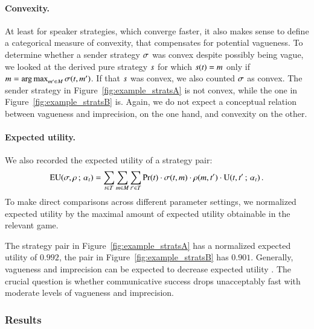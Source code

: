 \paragraph{Convexity.} At least for speaker strategies, which converge
faster, it also makes sense to define a categorical measure of
convexity, that compensates for potential vagueness. To determine
whether a sender strategy $\sigma$ was convex despite possibly being
vague, we looked at the derived pure strategy $s$ for which
$s(t) = m$ only if $m =
\operatorname*{arg\,max}_{m' \in M} \sigma(t,m')$. If that $s$
was convex, we also counted $\sigma$ as convex. The sender strategy
in Figure~\ref{fig:example_stratsA} is not convex, while the one in
Figure~\ref{fig:example_stratsB} is. Again, we do not expect a
conceptual relation between vagueness and imprecision, on the one
hand, and convexity on the other.

\paragraph{Expected utility.} We also recorded the expected utility of
a strategy pair:
\begin{align*}
  \mathrm{EU}(\sigma,\rho \thinspace ; \thinspace \alpha_t) = \sum_{t \in
    T} \sum_{m \in M} \sum_{t' \in T}
  \Pr(t) \cdot \sigma(t, m) \cdot \rho(m,
  t') \cdot \mathrm{U}(t,t' \thinspace ; \thinspace \alpha_t)\,.
\end{align*}
To make direct comparisons across different parameter settings, we
normalized expected utility by the maximal amount of expected utility
obtainable in the relevant game. 

The strategy pair in Figure~\ref{fig:example_stratsA} has a normalized
expected utility of $0.992$, the pair in
Figure~\ref{fig:example_stratsB} has $0.901$. Generally, vagueness and
imprecision can be expected to decrease expected utility
\citep{Lipman2009:Why-is-Language}. The crucial question is whether
communicative success drops unacceptably fast with moderate levels of
vagueness and imprecision.

\subsubsection{Results}

